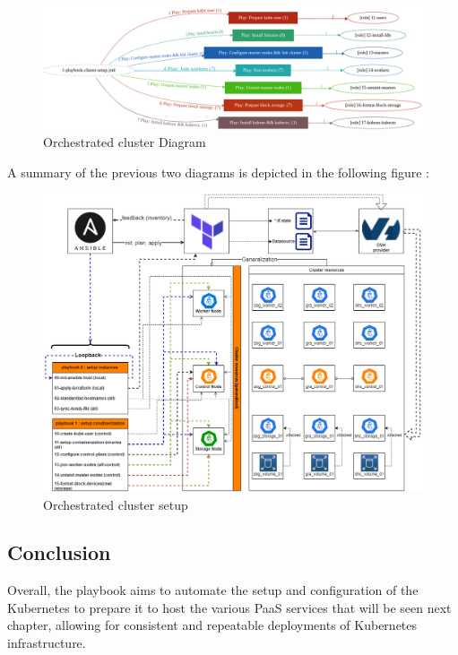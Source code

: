 \begin{figure}[H]\centering
\includegraphics[width=1.0\textwidth,angle=00]{assets/f18.png}
\caption{Orchestrated cluster Diagram}
\label{fig:fig18}
\end{figure}

A summary of the previous two diagrams is depicted in the following figure :

\begin{figure}[H]\centering
\includegraphics[width=1.0\textwidth,angle=00]{assets/f19.png}
\caption{Orchestrated cluster setup}
\label{fig:Orchestrated cluster setup}
\end{figure}

\subsection*{Conclusion}


Overall, the playbook aims to automate the setup and configuration of the Kubernetes to prepare it to host the various PaaS services that will be seen next chapter, allowing for consistent and repeatable deployments of Kubernetes infrastructure.

